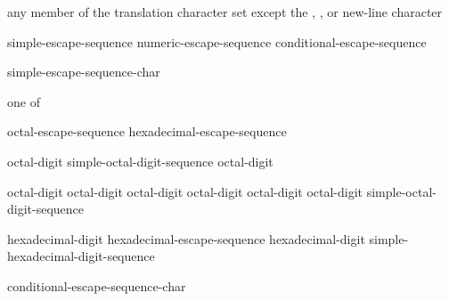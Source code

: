 \begin{bnf}
\br
    \textnormal{any member of the translation character set except the ,}\br
    \bnfindent\textnormal{, or new-line character}
\end{bnf}

\begin{bnf}
\br
    simple-escape-sequence\br
    numeric-escape-sequence\br
    conditional-escape-sequence
\end{bnf}

\begin{bnf}
\br
    \terminal{\textbackslash} simple-escape-sequence-char
\end{bnf}

\begin{bnf}
 \textnormal{one of}\br
\end{bnf}

\begin{bnf}
\br
    octal-escape-sequence\br
    hexadecimal-escape-sequence
\end{bnf}

\begin{bnf}
\br
    octal-digit\br
    simple-octal-digit-sequence octal-digit
\end{bnf}

\begin{bnf}
\br
    \terminal{\textbackslash} octal-digit\br
    \terminal{\textbackslash} octal-digit octal-digit\br
    \terminal{\textbackslash} octal-digit octal-digit octal-digit\br
     simple-octal-digit-sequence \terminal{\}}\br
\end{bnf}

\begin{bnf}
\br
     hexadecimal-digit\br
    hexadecimal-escape-sequence hexadecimal-digit\br
     simple-hexadecimal-digit-sequence \terminal{\}}
\end{bnf}

\begin{bnf}
\br
    \terminal{\textbackslash} conditional-escape-sequence-char
\end{bnf}

